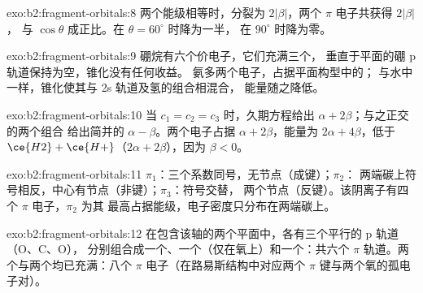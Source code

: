 \begin{solution}{exo:b2:fragment-orbitals:8}
两个能级相等时，分裂为 $2|\beta|$，两个 $\pi$ 电子共获得 $2|\beta|$，
与 $\cos\theta$ 成正比。在 $\theta = 60^\circ$ 时降为一半，
在 $90^\circ$ 时降为零。
\end{solution}

\begin{solution}{exo:b2:fragment-orbitals:9}
硼烷有六个价电子，它们充满三个，
垂直于平面的硼 p 轨道保持为空，锥化没有任何收益。
氨多两个电子，占据平面构型中的；
与水中一样，锥化使其与 2s 轨道及氢的组合相混合，
能量随之降低。
\end{solution}

\begin{solution}{exo:b2:fragment-orbitals:10}
当 $c_1 = c_2 = c_3$ 时，久期方程给出 $\alpha + 2\beta$；与之正交的两个组合
给出简并的 $\alpha - \beta$。两个电子占据 $\alpha + 2\beta$，能量为
$2\alpha + 4\beta$，低于 $\ce{H2} + \ce{H+}$（$2\alpha + 2\beta$），因为 $\beta < 0$。
\end{solution}

\begin{solution}{exo:b2:fragment-orbitals:11}
$\pi_1$：三个系数同号，无节点（成键）；$\pi_2$：
两端碳上符号相反，中心有节点（非键）；$\pi_3$：符号交替，
两个节点（反键）。该阴离子有四个 $\pi$ 电子，$\pi_2$ 为其
最高占据能级，电子密度只分布在两端碳上。
\end{solution}

\begin{solution}{exo:b2:fragment-orbitals:12}
在包含该轴的两个平面中，各有三个平行的 p 轨道（O、C、O），
分别组合成一个、一个（仅在氧上）和一个：共六个
$\pi$ 轨道。两个与两个均已充满：八个
$\pi$ 电子（在路易斯结构中对应两个 $\pi$ 键与两个氧的孤电子对）。
\end{solution}

